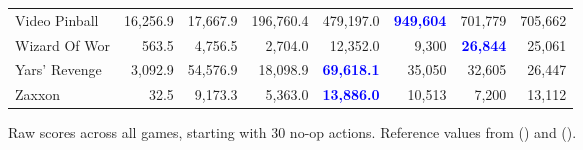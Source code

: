 \documentclass[letterpaper]{article}
\newcommand{\citet}[1]{\citeauthor{#1} (\citeyear{#1})}
\begin{document}
\begin{figure}
\begin{tabular}{ l | r|r|r|r|r|r| r }
Video Pinball & 16,256.9 & 17,667.9 & 196,760.4 & 479,197.0 & \textbf{\textcolor{blue}{949,604}} & 701,779 & 705,662 \\
Wizard Of Wor & 563.5 & 4,756.5 & 2,704.0 & 12,352.0 & 9,300 & \textbf{\textcolor{blue}{26,844}} & 25,061 \\
Yars' Revenge & 3,092.9 & 54,576.9 & 18,098.9 & \textbf{\textcolor{blue}{69,618.1}} & 35,050 & 32,605 & 26,447 \\
Zaxxon & 32.5 & 9,173.3 & 5,363.0 & \textbf{\textcolor{blue}{13,886.0}} & 10,513 & 7,200 & 13,112
\end{tabular}
\caption{Raw scores across all games, starting with 30 no-op actions. Reference values from \citet{wang2016dueling} and \citet{c51}.\label{fig:atari_sota}}
\end{figure}
\end{document}
